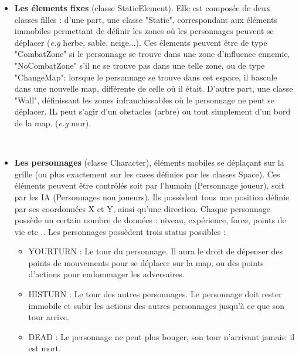 \documentclass[12pt,a4paper]{report}
\begin{document}
\begin{itemize}
    

    \item  \textbf{Les élements fixes} (classe StaticElement). Elle est composée de deux classes filles : d'une part, une classe "Static", correspondant aux éléments immobiles permettant de définir les zones où les personnages peuvent se déplacer (\textit{e.g} herbe, sable, neige...). Ces élements peuvent être de type "CombatZone" si le personnage se trouve dans une zone d'influence ennemie, "NoCombatZone" s'il ne se trouve pas dans une telle zone, ou de type "ChangeMap": lorsque le personnage se trouve dans cet espace, il bascule dans une nouvelle map, différente de celle où il était.
   D'autre part, une classe "Wall", définissant les zones infranchissables où le personnage ne peut se déplacer. IL peut s'agir d'un obstacles (arbre) ou tout simplement d'un bord de la map. (\textit{e.g}  mur).
    
         
\par\leavevmode\
    \item \textbf{Les personnages} (classe Character), éléments mobiles se déplaçant sur la grille (ou plus exactement sur les cases définies par les classes Space). Ces éléments peuvent être contrôlés soit par l'humain (Personnage joueur), soit par les IA (Personnages non joueurs). Ils possèdent tous une position définie par ses coordonnées X et Y, ainsi qu'une direction. Chaque personnage possède un certain nombre de données : niveau, expérience, force, points de vie etc .. Les personnages possèdent trois status possibles :
    \begin{itemize}
    
    \item YOURTURN : Le tour du personnage. Il aura le droit de dépenser des points de mouvements pour se déplacer sur la map, ou des points d'actions pour endommager les adversaires.
    \item HISTURN : Le tour des autres personnages. Le personnage doit rester immobile et subir les actions des autres personnages jusqu'à ce que son tour arrive.
    \item  DEAD : Le personnage ne peut plus bouger, son tour n'arrivant jamais: il est mort.

    \end{itemize}
    
    \end{itemize}
    
\end{document}
